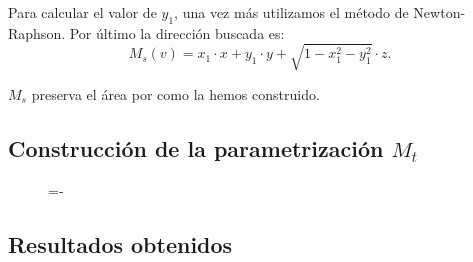 Para calcular el valor de $y_1$, una vez más utilizamos el método de Newton-Raphson. Por último la dirección buscada es:
$$M_s(v) = x_1\cdot x + y_1\cdot y + \sqrt{1-x_1^2-y_1^2} \cdot z.$$

$M_s$ preserva el área por como la hemos construido.

\subsection{Construcción de la parametrización $M_t$}

\begin{figure}[h]
  \lineskip=-\fboxrule
\end{figure}

\subsection{Resultados obtenidos}

